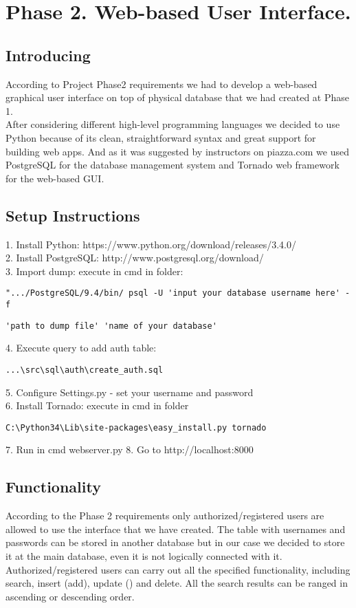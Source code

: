 \documentclass{article}
\begin{document}
\newpage
\section{Phase 2. Web-based User Interface.}

\subsection{Introducing}
According to Project Phase2 requirements we had to develop a web-based graphical user interface on top of physical database that we had created at Phase 1. \\
After considering different high-level programming languages we decided to use Python because of its clean, straightforward syntax and great support for building web apps. And as it was suggested by instructors on piazza.com we used PostgreSQL for the database management system and Tornado web framework for the web-based GUI.

\subsection{Setup Instructions}

1. Install Python: https://www.python.org/download/releases/3.4.0/ \\
2. Install PostgreSQL: http://www.postgresql.org/download/ \\
3. Import dump: execute in cmd in folder: 
\begin{verbatim}
".../PostgreSQL/9.4/bin/ psql -U 'input your database username here' -f \end{verbatim}
\begin{verbatim}
'path to dump file' 'name of your database' 
\end{verbatim} 
4. Execute query to add auth table:
\begin{verbatim}
...\src\sql\auth\create_auth.sql
\end{verbatim} 
5. Configure Settings.py - set your username and password \\
6. Install Tornado: execute in cmd in folder
\begin{verbatim}
C:\Python34\Lib\site-packages\easy_install.py tornado 
\end{verbatim}
7. Run in cmd webserver.py 
8. Go to http://localhost:8000 \\

\subsection{Functionality}
According to the Phase 2 requirements only authorized/registered users are allowed to use the interface that we have created. The table with usernames and passwords can be stored in another database but in our case we decided to store it at the main database, even it is not logically connected with it.
Authorized/registered users can carry out all the specified functionality, including search, insert (add), update () and delete.
All the search results can be ranged in ascending or descending order.
\end{document}
